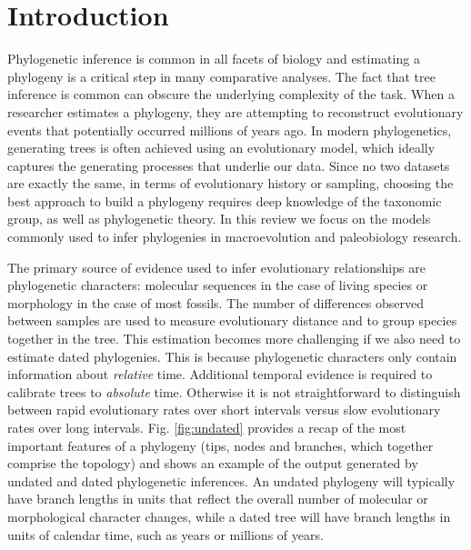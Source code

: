 
\section{Introduction}

Phylogenetic inference is common in all facets of biology and estimating a phylogeny is a critical step in many comparative analyses. The fact that tree inference is common can obscure the underlying complexity of the task.
When a researcher estimates a phylogeny, they are attempting to reconstruct evolutionary events that potentially occurred millions of years ago.
In modern phylogenetics, generating trees is often achieved using an evolutionary model, which ideally captures the generating processes that underlie our data.
Since no two datasets are exactly the same, in terms of evolutionary history or sampling, 
choosing the best approach to build a phylogeny requires deep knowledge of the taxonomic group, as well as phylogenetic theory.
In this review we focus on the models commonly used to infer phylogenies in macroevolution and paleobiology research.

The primary source of evidence used to infer evolutionary relationships are phylogenetic characters: molecular sequences in the case of living species or morphology in the case of most fossils. 
The number of differences observed between samples are used to measure evolutionary distance and to group species together in the tree.
This estimation becomes more challenging if we also need to estimate dated phylogenies.
This is because phylogenetic characters only contain information about \textit{relative} time. 
Additional temporal evidence is required to calibrate trees to \textit{absolute} time.
Otherwise it is not straightforward to distinguish between rapid evolutionary rates over short intervals versus slow evolutionary rates over long intervals.
Fig. \ref{fig:undated} provides a recap of the most important features of a phylogeny (tips, nodes and branches, which together comprise the topology) and shows an example of the output generated by undated and dated phylogenetic inferences. 
An undated phylogeny will typically have branch lengths in units that reflect the overall number of molecular or morphological character changes, while a dated tree will have branch lengths in units of calendar time, such as years or millions of years.


